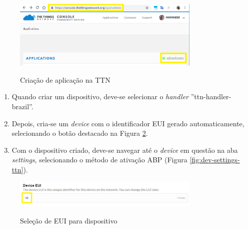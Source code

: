 \documentclass[oneside,openright,12pt]{ufsm_2015} %
\begin{document}
    \begin{figure}[ht]
 	    \caption{\label{exepretex} Criação de aplicação na TTN}
        \centering
        \includegraphics[width=0.8\textwidth]{figuras/create-app-ttn.png}
        \vspace{\baselineskip} %
        \label{fig:add-app-ttn}
    \end{figure}
    
    \begin{enumerate}
        \item Quando criar um dispositivo, deve-se selecionar o \textit{handler} ''ttn-handler-brazil''.
        \item Depois, cria-se um \textit{device} com o identificador EUI gerado automaticamente, selecionando o botão destacado na Figura \ref{fig:dev-eui-ttn}.
        \item Com o dispositivo criado, deve-se navegar até o \textit{device} em questão na aba \textit{settings}, selecionando o método de ativação ABP (Figura \ref{fig:dev-settings-ttn}).
    \end{enumerate}
    
    \begin{figure}[ht]
 	    \caption{\label{exepretex} Seleção de EUI para dispositivo}
        \centering
        \includegraphics[width=0.8\textwidth]{figuras/device_eui.png}
        \vspace{\baselineskip} %
        \label{fig:dev-eui-ttn}
    \end{figure}
    
\end{document}

